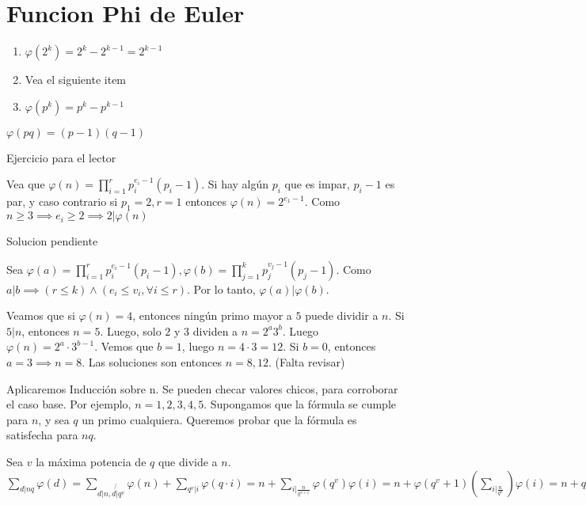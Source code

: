 \section{Funcion Phi de Euler}

\begin{sol}
	\begin{enumerate}
		\item $\varphi (2^k) = 2^k-2^{k-1} = 2^{k-1}$
		\item Vea el siguiente item
		\item $\varphi(p^{k}) = p^{k}-p^{k-1}$
		\end{enumerate}
\end{sol}

\begin{sol}
	$\varphi(pq) = (p-1)(q-1)$
\end{sol}

\begin{sol}
	Ejercicio para el lector
\end{sol}

\begin{sol}
	Vea que $\varphi(n) = \prod_{i=1}^{r} p_{i}^{e_{i}-1}(p_{i}-1)$. Si hay alg\'un $p_{i}$ que es impar, $p_{i}-1$ es par, y caso contrario si $p_{1}=2, r = 1$ entonces $\varphi(n) = 2^{e_{1}-1}$. Como $n\geq 3 \implies e_{i}\geq 2 \implies 2|\varphi(n)$
\end{sol}

\begin{sol}
	Solucion pendiente
\end{sol}



\begin{sol}
	Sea $\varphi(a) = \prod_{i=1}^{r} p_{i}^{e_{i}-1}(p_{i}-1), \varphi(b) = \prod_{j=1}^{k} p_{j}^{v_{j}-1}(p_{j}-1)$. Como $a|b\implies (r\leq k) \land ( e_{i} \leq v_{i}, \forall i\leq r)$. Por lo tanto, $\varphi(a)|\varphi(b)$.
\end{sol}

\begin{sol}
	Veamos que si $\varphi(n) = 4$, entonces ning\'un primo mayor a $5$ puede dividir a $n$. Si $5|n$, entonces $n=5$. Luego, solo $2$ y $3$ dividen a $n= 2^{a} 3^{b}$. Luego $\varphi(n) = 2^{a}\cdot 3^{b-1}$. Vemos que $b = 1$, luego $n = 4\cdot 3 = 12$. Si $b = 0$, entonces $a=3 \implies n = 8$. Las soluciones son entonces $n = 8, 12$. (Falta revisar)
\end{sol}

\begin{sol}
	Aplicaremos Inducci\'on sobre n. Se pueden checar valores chicos, para corroborar el caso base. Por ejemplo, $n = 1, 2, 3, 4, 5$. Supongamos que la f\'ormula se cumple para $n$, y sea $q$ un primo cualquiera. Queremos probar que la f\'ormula es satisfecha para $nq$.

	Sea $v$ la m\'axima potencia de $q$ que divide a $n$. $\sum_{d|nq} \varphi(d) = \sum_{d|n, d\not{|} q^{v}}\varphi(n) +\sum_{q^{v} |i} \varphi(q\cdot i) = n + \sum_{i|\frac{n}{q^{v+1}}} \varphi(q^{v})\varphi(i) = n + \varphi(q^v+1) (\sum_{i|\frac{n}{q^{v}}}) \varphi(i) = n + q^{v}(q-1)\frac{n}{q^{v}}= n + (q-1)n = nq. \square$
\end{sol}

